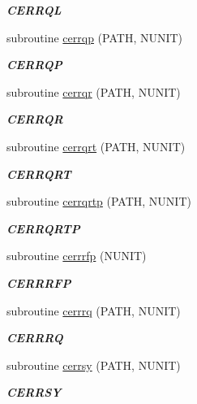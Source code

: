 \begin{DoxyCompactItemize}
\begin{DoxyCompactList}\small\item\em {\bfseries C\+E\+R\+R\+Q\+L} \end{DoxyCompactList}\item 
subroutine \hyperlink{group__complex__lin_gaf001e40ca1020beea4d1dcdf8bc25642}{cerrqp} (P\+A\+T\+H, N\+U\+N\+I\+T)
\begin{DoxyCompactList}\small\item\em {\bfseries C\+E\+R\+R\+Q\+P} \end{DoxyCompactList}\item 
subroutine \hyperlink{group__complex__lin_gadf466dfb829721a9f9e8e02290aee37c}{cerrqr} (P\+A\+T\+H, N\+U\+N\+I\+T)
\begin{DoxyCompactList}\small\item\em {\bfseries C\+E\+R\+R\+Q\+R} \end{DoxyCompactList}\item 
subroutine \hyperlink{group__complex__lin_gae735fae64d44ef1bc713529dcb8a7bde}{cerrqrt} (P\+A\+T\+H, N\+U\+N\+I\+T)
\begin{DoxyCompactList}\small\item\em {\bfseries C\+E\+R\+R\+Q\+R\+T} \end{DoxyCompactList}\item 
subroutine \hyperlink{group__complex__lin_ga8076764789437cf6ba0806ecb18f0a57}{cerrqrtp} (P\+A\+T\+H, N\+U\+N\+I\+T)
\begin{DoxyCompactList}\small\item\em {\bfseries C\+E\+R\+R\+Q\+R\+T\+P} \end{DoxyCompactList}\item 
subroutine \hyperlink{group__complex__lin_ga2f55ea23ec898f0d14324b6f01de6edf}{cerrrfp} (N\+U\+N\+I\+T)
\begin{DoxyCompactList}\small\item\em {\bfseries C\+E\+R\+R\+R\+F\+P} \end{DoxyCompactList}\item 
subroutine \hyperlink{group__complex__lin_gad86e4e0c60c672cd385047ae9f18aaf8}{cerrrq} (P\+A\+T\+H, N\+U\+N\+I\+T)
\begin{DoxyCompactList}\small\item\em {\bfseries C\+E\+R\+R\+R\+Q} \end{DoxyCompactList}\item 
subroutine \hyperlink{group__complex__lin_ga7bb5e8a8907d87e4eb750a35aae617f1}{cerrsy} (P\+A\+T\+H, N\+U\+N\+I\+T)
\begin{DoxyCompactList}\small\item\em {\bfseries C\+E\+R\+R\+S\+Y} \end{DoxyCompactList}\item 

\end{DoxyCompactItemize}
